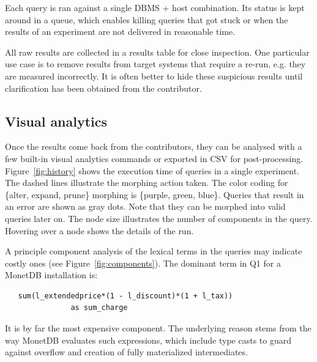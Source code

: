 \documentclass{cidr-2019}
\begin{document}
Each query is ran against a single DBMS + host combination. Its status is kept around in a queue, which enables killing queries that got stuck or when the results of an experiment are not delivered in reasonable time.

All raw results are collected in a results table for close inspection. One particular use
case is to remove results from target systems that require a re-run, e.g. they
are measured incorrectly. 
It is often better to hide these
suspicious results until clarification has been obtained from the contributor.

\subsection{Visual analytics}

Once the results come back from the contributors, they can be analysed with a few
built-in visual analytics commands or exported in CSV for post-processing.
Figure~\ref{fig:history} shows the
execution time of queries in a single experiment. The dashed lines illustrate the morphing action taken. 
The color coding for \{alter,
expand, prune\} morphing is \{purple, green, blue\}. Queries that result in an
error are shown as gray dots. Note that they
can be morphed into valid queries later on. The node size illustrates the number
of components in the query. Hovering over a node shows the details of the
run. 

A principle component analysis of the lexical terms in the queries may indicate costly ones (see Figure~\ref{fig:components}). 
The dominant term in Q1 for a MonetDB installation is:
\begin{verbatim}
   sum(l_extendedprice*(1 - l_discount)*(1 + l_tax))
               as sum_charge
\end{verbatim}
It is by far the most expensive component. The underlying reason stems from the way MonetDB
evaluates such expressions, which include type casts to guard against
overflow and creation of fully materialized intermediates. 
\end{document}
